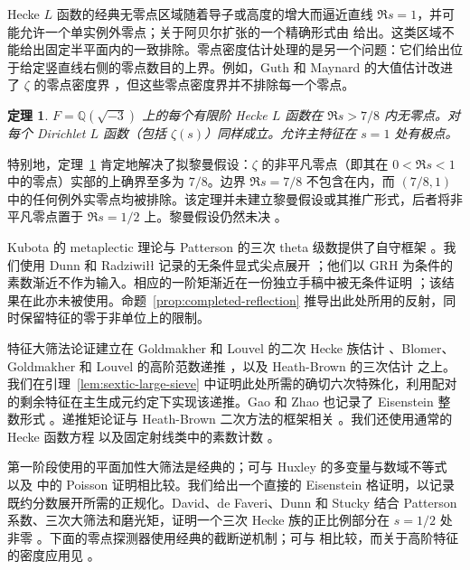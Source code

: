\documentclass[11pt,a4paper]{article}
\numberwithin{equation}{section}
\numberwithin{figure}{section}
\newtheorem{theorem}{定理}[section]
\theoremstyle{definition}
\theoremstyle{remark}
\begin{document}
Hecke $L$ 函数的经典无零点区域随着导子或高度的增大而逼近直线 $\Re s=1$，并可能允许一个单实例外零点；关于阿贝尔扩张的一个精确形式由 \cite[定理 3.1]{TZ} 给出。这类区域不能给出固定半平面内的一致排除。零点密度估计处理的是另一个问题：它们给出位于给定竖直线右侧的零点数目的上界。例如，Guth 和 Maynard 的大值估计改进了 $\zeta$ 的零点密度界 \cite[定理 1.2]{GM}，但这些零点密度界并不排除每一个零点。

\begin{theorem}\label{thm:main}
$F=\mathbb Q(\sqrt{-3})$ 上的每个有限阶 Hecke $L$ 函数在 $\Re s>7/8$ 内无零点。对每个 Dirichlet $L$ 函数（包括 $\zeta(s)$）同样成立。允许主特征在 $s=1$ 处有极点。
\end{theorem}

特别地，定理~\ref{thm:main} 肯定地解决了拟黎曼假设：$\zeta$ 的非平凡零点（即其在 $0<\Re s<1$ 中的零点）实部的上确界至多为 $7/8$。边界 $\Re s=7/8$ 不包含在内，而 $(7/8,1)$ 中的任何例外实零点均被排除。该定理并未建立黎曼假设或其推广形式，后者将非平凡零点置于 $\Re s=1/2$ 上。黎曼假设仍然未决 \cite{Clay}。

Kubota 的 metaplectic 理论与 Patterson 的三次 theta 级数提供了自守框架 \cite{Kubota,Patterson}。我们使用 Dunn 和 Radziwi\l\l{} 记录的无条件显式尖点展开 \cite[第 5 节与附录 A]{DR}；他们以 GRH 为条件的素数渐近不作为输入。相应的一阶矩渐近在一份独立手稿中被无条件证明 \cite[定理~1.1]{OpenAICubicFirstMoment}；该结果在此亦未被使用。命题~\ref{prop:completed-reflection} 推导出此处所用的反射，同时保留特征的零于非单位上的限制。

特征大筛法论证建立在 Goldmakher 和 Louvel 的二次 Hecke 族估计 \cite[定义 1 与定理 1.1]{GL}、Blomer、Goldmakher 和 Louvel 的高阶范数递推 \cite[定理 1.3 与第 3 节]{BGL}，以及 Heath-Brown 的三次估计 \cite[定理 2]{HB} 之上。我们在引理~\ref{lem:sextic-large-sieve} 中证明此处所需的确切六次特殊化，利用配对的剩余特征在主生成元约定下实现该递推。Gao 和 Zhao 也记录了 Eisenstein 整数形式 \cite[引理 2.9]{GZSextic}。递推矩论证与 Heath-Brown 二次方法的框架相关 \cite[第 2 节]{HBQuadratic}。我们还使用通常的 Hecke 函数方程 \cite[方程 (1.1)]{GZ} 以及固定射线类中的素数计数 \cite[定理 1.1]{TZ}。

第一阶段使用的平面加性大筛法是经典的；可与 Huxley 的多变量与数域不等式 \cite{Huxley} 以及 \cite[第 3 节，定理 3]{BaierBansal} 中的 Poisson 证明相比较。我们给出一个直接的 Eisenstein 格证明，以记录既约分数展开所需的正规化。David、de Faveri、Dunn 和 Stucky 结合 Patterson 系数、三次大筛法和磨光矩，证明一个三次 Hecke 族的正比例部分在 $s=1/2$ 处非零 \cite[定理 1.1 与第 1.2 节]{DFDS}。下面的零点探测器使用经典的截断逆机制；可与 \cite[附录 C]{MP} 相比较，而关于高阶特征的密度应用见 \cite[推论 1.6 与第 5 节]{BGL}。
\end{document}
